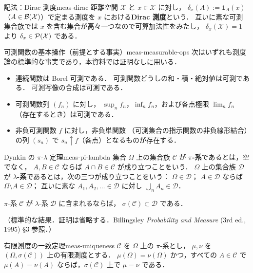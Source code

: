 \begin{remark}{記法：Dirac 測度}{meas-dirac}
  距離空間 $\mathcal{X}$ と $x\in\mathcal{X}$ に対し，
  $\delta_x(A):=\mathbf{1}_A(x)$（$A\in\mathcal{B}(\mathcal{X})$）で定まる測度を
  $x$ における\textbf{Dirac 測度}という．
  互いに素な可測集合族では $x$ を含む集合が高々一つなので可算加法性をみたし，
  $\delta_x(\mathcal{X})=1$ より $\delta_x\in\mathcal{P}(\mathcal{X})$ である．
\end{remark}

\begin{remark}{可測関数の基本操作（前提とする事実）}{meas-measurable-ops}
  次はいずれも測度論の標準的な事実であり，本資料では証明なしに用いる．
  \begin{itemize}
    \item 連続関数は Borel 可測である．
      可測関数どうしの和・積・絶対値は可測である．
      可測写像の合成は可測である．
    \item 可測関数列 $(f_n)$ に対し，
      $\sup_n f_n$，$\inf_n f_n$，および各点極限 $\lim_n f_n$
      （存在するとき）は可測である．
    \item 非負可測関数 $f$ に対し，非負単関数
      （可測集合の指示関数の非負線形結合）の列 $(s_n)$ で
      $s_n\uparrow f$（各点）となるものが存在する．
  \end{itemize}
\end{remark}

\begin{theorem}{Dynkin の $\pi$-$\lambda$ 定理}{meas-pi-lambda}
  集合 $\Omega$ 上の集合族 $\mathcal{C}$ が
  \textbf{$\pi$-系}であるとは，空でなく，
  $A,B\in\mathcal{C}$ ならば $A\cap B\in\mathcal{C}$
  が成り立つことをいう．
  $\Omega$ 上の集合族 $\mathcal{D}$ が
  \textbf{$\lambda$-系}であるとは，次の三つが成り立つことをいう：
  $\Omega\in\mathcal{D}$；
  $A\in\mathcal{D}$ ならば $\Omega\setminus A\in\mathcal{D}$；
  互いに素な $A_1,A_2,\ldots\in\mathcal{D}$ に対し
  $\bigcup_{n}A_n\in\mathcal{D}$．

  $\pi$-系 $\mathcal{C}$ が $\lambda$-系 $\mathcal{D}$ に含まれるならば，
  $\sigma(\mathcal{C})\subset\mathcal{D}$ である．

  （標準的な結果．証明は省略する．Billingsley \emph{Probability and Measure}
  (3rd ed., 1995) §3 参照．）
\end{theorem}

\begin{theorem}{有限測度の一致定理}{meas-uniqueness}
  $\mathcal{C}$ を $\Omega$ 上の $\pi$-系とし，
  $\mu,\nu$ を $(\Omega,\sigma(\mathcal{C}))$ 上の有限測度とする．
  $\mu(\Omega)=\nu(\Omega)$ かつ，すべての $A\in\mathcal{C}$ で
  $\mu(A)=\nu(A)$ ならば，$\sigma(\mathcal{C})$ 上で $\mu=\nu$ である．

\end{theorem}

